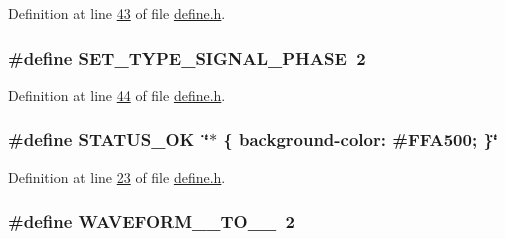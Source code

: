 Definition at line \hyperlink{a00090_source_l00043}{43} of file \hyperlink{a00090_source}{define.\+h}.

\hypertarget{a00090_a45f9851d4938b1ce68a1aad58d8776cc}{
\subsubsection[{S\+E\+T\+\_\+\+T\+Y\+P\+E\+\_\+\+S\+I\+G\+N\+A\+L\+\_\+\+P\+H\+A\+S\+E}]{\setlength{\rightskip}{0pt plus 5cm}\#define S\+E\+T\+\_\+\+T\+Y\+P\+E\+\_\+\+S\+I\+G\+N\+A\+L\+\_\+\+P\+H\+A\+S\+E~2}}\label{a00090_a45f9851d4938b1ce68a1aad58d8776cc}


Definition at line \hyperlink{a00090_source_l00044}{44} of file \hyperlink{a00090_source}{define.\+h}.

\hypertarget{a00090_a2403320c41f08e7567cb169de5db66b3}{
\subsubsection[{S\+T\+A\+T\+U\+S\+\_\+\+O\+K}]{\setlength{\rightskip}{0pt plus 5cm}\#define S\+T\+A\+T\+U\+S\+\_\+\+O\+K~\char`\"{}$\ast$ \{ background-\/color\+: \#F\+F\+A500; \}\char`\"{}}}\label{a00090_a2403320c41f08e7567cb169de5db66b3}


Definition at line \hyperlink{a00090_source_l00023}{23} of file \hyperlink{a00090_source}{define.\+h}.

\hypertarget{a00090_ae18fed2471b16a8516d721ff60671dd9}{
\subsubsection[{W\+A\+V\+E\+F\+O\+R\+M\+\_\+0\+\_\+\+T\+O\+\_\+3\+\_\+3}]{\setlength{\rightskip}{0pt plus 5cm}\#define W\+A\+V\+E\+F\+O\+R\+M\+\_\+\_\+\+T\+O\+\_\+\_~2}}\label{a00090_ae18fed2471b16a8516d721ff60671dd9}


